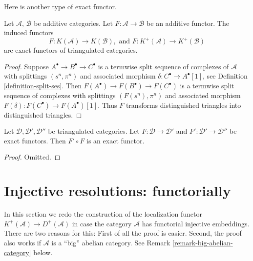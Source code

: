 \noindent
Here is another type of exact functor.

\begin{lemma}
\label{lemma-additive-exact-homotopy-category}
Let $\mathcal{A}$, $\mathcal{B}$ be additive categories.
Let $F : \mathcal{A} \to \mathcal{B}$ be an additive functor.
The induced functors
$$
F : K(\mathcal{A}) \longrightarrow K(\mathcal{B}),
\text{ and }
F : K^{+}(\mathcal{A}) \longrightarrow K^{+}(\mathcal{B})
$$
are exact functors of triangulated categories.
\end{lemma}

\begin{proof}
Suppose $A^\bullet \to B^\bullet \to C^\bullet$
is a termwise split sequence of complexes of $\mathcal{A}$ with splittings
$(s^n, \pi^n)$ and associated morphism $\delta : C^\bullet \to A^\bullet[1]$,
see Definition \ref{definition-split-ses}. Then
$F(A^\bullet) \to F(B^\bullet) \to F(C^\bullet)$
is a termwise split sequence of complexes with splittings
$(F(s^n), \pi^n)$ and associated morphism
$F(\delta) : F(C^\bullet) \to F(A^\bullet)[1]$.
Thus $F$ transforms distinguished triangles into distinguished triangles.
\end{proof}

\begin{lemma}
\label{lemma-composition-exact}
Let $\mathcal{D}, \mathcal{D}', \mathcal{D}''$ be triangulated categories.
Let $F : \mathcal{D} \to \mathcal{D}'$ and
$F' : \mathcal{D}' \to \mathcal{D}''$ be exact functors.
Then $F' \circ F$ is an exact functor.
\end{lemma}

\begin{proof}
Omitted.
\end{proof}









\section{Injective resolutions: functorially}
\label{section-functorial-injective-resolutions}

\noindent
In this section we redo the construction of the localization functor
$K^{+}(\mathcal{A}) \to D^{+}(\mathcal{A})$ in case the
category $\mathcal{A}$ has functorial injective embeddings.
There are two reasons for this: First of all the proof is easier.
Second, the proof also works if $\mathcal{A}$ is a ``big'' abelian
category. See Remark \ref{remark-big-abelian-category} below.

